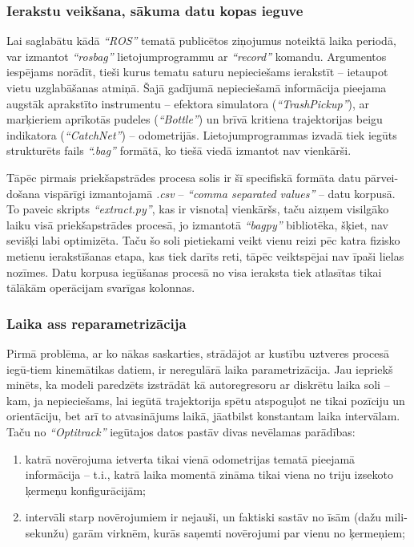 \documentclass[12pt, a4paper]{article}
\numberwithin{equation}{section} %
\begin{document}
\subsubsection{Ierakstu veikšana, sākuma datu kopas ieguve}

Lai saglabātu kādā \textit{``ROS''} tematā publicētos ziņojumus noteiktā laika periodā, var izmantot \textit{``rosbag''} lietojumprogrammu ar \textit{``record''} komandu. Argumentos iespējams norādīt, tieši kurus tematu saturu nepieciešams ierakstīt -- ietaupot vietu uzglabāšanas atmiņā. Šajā gadījumā nepieciešamā informācija pieejama augstāk aprakstīto instrumentu -- efektora simulatora (\textit{``TrashPickup''}), ar marķieriem aprīkotās pudeles (\textit{``Bottle''}) un brīvā kritiena trajektorijas beigu indikatora (\textit{``CatchNet''}) -- odometrijās.  Lietojumprogrammas izvadā tiek iegūts strukturēts fails \textit{``.bag''} formātā, ko tiešā viedā izmantot nav vienkārši.

Tāpēc pirmais priekšapstrādes procesa solis ir šī specifiskā formāta datu pārvei-došana vispārīgi izmantojamā \textit{.csv} -- \textit{``comma separated values''} -- datu korpusā. To paveic skripts \textit{``extract.py''}, kas ir visnotaļ vienkāršs, taču aizņem visilgāko laiku visā priekšapstrādes procesā, jo izmantotā \textit{``bagpy''} bibliotēka, šķiet, nav sevišķi labi optimizēta. Taču šo soli pietiekami veikt vienu reizi pēc katra fizisko metienu ierakstīšanas etapa, kas tiek darīts reti, tāpēc veiktspējai nav īpaši lielas nozīmes. Datu korpusa iegūšanas procesā no visa ieraksta tiek atlasītas tikai tālākām operācijam svarīgas kolonnas.

\subsubsection{Laika ass reparametrizācija}

Pirmā problēma, ar ko nākas saskarties, strādājot ar kustību uztveres procesā iegū-tiem kinemātikas datiem, ir neregulārā laika parametrizācija. Jau iepriekš minēts, ka modeli paredzēts izstrādāt kā autoregresoru ar diskrētu laika soli -- kam, ja nepieciešams, lai iegūtā trajektorija spētu atspoguļot ne tikai pozīciju un orientāciju, bet arī to atvasinājums laikā, jāatbilst konstantam laika intervālam. Taču no \textit{``Optitrack''} iegūtajos datos pastāv divas nevēlamas parādības:

\begin{enumerate}
    \item katrā novērojuma ietverta tikai vienā odometrijas tematā pieejamā informācija -- t.i., katrā laika momentā zināma tikai viena no triju izsekoto ķermeņu konfigurācijām;
    \item intervāli starp novērojumiem ir nejauši, un faktiski sastāv no īsām (dažu mili-sekunžu) garām virknēm, kurās saņemti novērojumi par vienu no ķermeņiem;
\end{enumerate}
\end{document}
